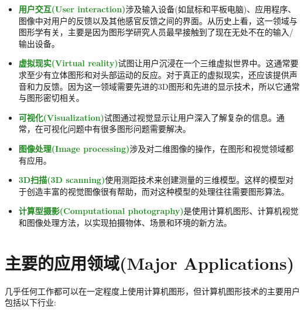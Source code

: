 \begin{itemize}
	\item \textbf{\textcolor{ForestGreen}{用户交互(User interaction)}}涉及输入设备(如鼠标和平板电脑)、应用程序、图像中对用户的反馈以及其他感官反馈之间的界面。从历史上看，这一领域与图形学有关，主要是因为图形学研究人员最早接触到了现在无处不在的输入/输出设备。

	\item \textbf{\textcolor{ForestGreen}{虚拟现实(Virtual reality)}}试图让用户沉浸在一个三维虚拟世界中。这通常要求至少有立体图形和对头部运动的反应。对于真正的虚拟现实，还应该提供声音和力反馈。因为这一领域需要先进的3D图形和先进的显示技术，所以它通常与图形密切相关。

	\item \textbf{\textcolor{ForestGreen}{可视化(Visualization)}}试图通过视觉显示让用户深入了解复杂的信息。通常，在可视化问题中有很多图形问题需要解决。

	\item \textbf{\textcolor{ForestGreen}{图像处理(Image processing)}}涉及对二维图像的操作，在图形和视觉领域都有应用。

	\item \textbf{\textcolor{ForestGreen}{3D扫描(3D scanning)}}使用测距技术来创建测量的三维模型。这样的模型对于创造丰富的视觉图像很有帮助，而对这种模型的处理往往需要图形算法。

	\item \textbf{\textcolor{ForestGreen}{计算型摄影(Computational photography)}}是使用计算机图形、计算机视觉和图像处理方法，以实现拍摄物体、场景和环境的新方法。

\end{itemize}

\section{主要的应用领域(Major Applications)}

几乎任何工作都可以在一定程度上使用计算机图形，但计算机图形技术的主要用户包括以下行业:

